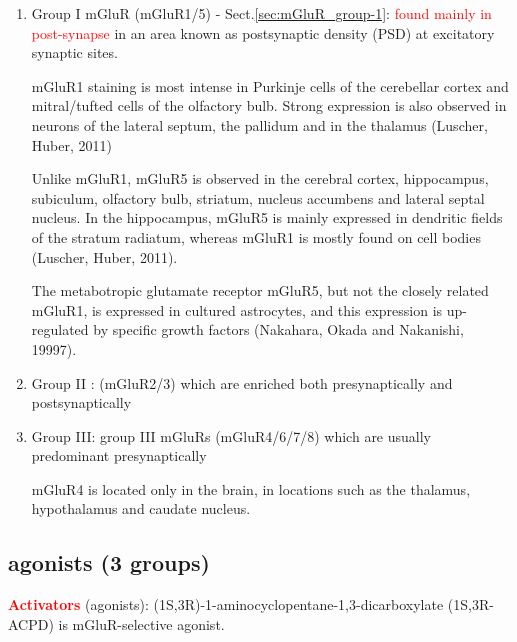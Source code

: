 \begin{enumerate}
  \item Group I mGluR (mGluR1/5) - Sect.\ref{sec:mGluR_group-1}:
    \textcolor{red}{found mainly in post-synapse} in an area known as
    postsynaptic density (PSD) at excitatory synaptic sites.

mGluR1 staining is most intense in Purkinje cells of the cerebellar cortex and
mitral/tufted cells of the olfactory bulb.  Strong expression is also observed
in neurons of the lateral septum, the pallidum and in the thalamus (Luscher, Huber, 2011)


Unlike mGluR1, mGluR5 is observed in the cerebral cortex, hippocampus,
subiculum, olfactory bulb, striatum, nucleus accumbens and lateral septal
nucleus. In the hippocampus, mGluR5 is mainly expressed in dendritic fields of
the stratum radiatum, whereas mGluR1 is mostly found on cell bodies (Luscher,
Huber, 2011).

The metabotropic glutamate receptor mGluR5, but not the closely related mGluR1,
is expressed in cultured astrocytes, and this expression is up-regulated by
specific growth factors (Nakahara, Okada and Nakanishi, 19997).

  
  \item Group II :   (mGluR2/3) which are enriched both presynaptically and
postsynaptically
  
  
  \item Group III: 
  group III mGluRs (mGluR4/6/7/8) which are usually predominant presynaptically

mGluR4 is located only in the brain, in locations such as the thalamus,
hypothalamus and caudate nucleus.   
\end{enumerate}

\subsection{agonists (3 groups)}
\label{sec:mGluR_group-1-agonist}

\textcolor{red}{\bf Activators} (agonists):
(1S,3R)-1-aminocyclopentane-1,3-dicarboxylate (1S,3R-ACPD) is mGluR-selective
agonist.

